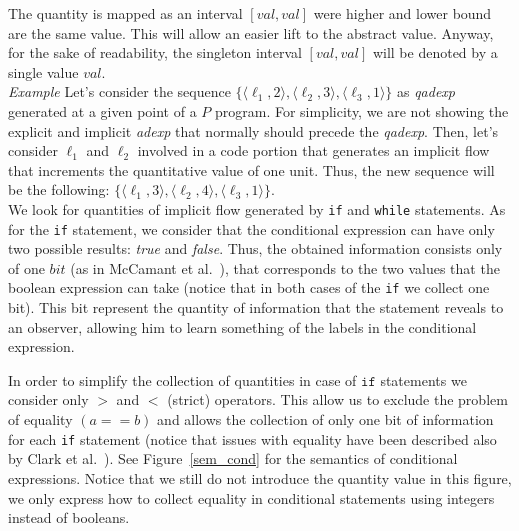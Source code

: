 \documentclass{llncs}
\newcommand{\notegian}[1]{\textbf{(NOTE: #1)}}
\begin{document}
\noindent The quantity is mapped as an interval $[val, val]$ were higher and lower bound are the same value. This will allow an easier lift to the abstract value. Anyway, for the sake of readability, the singleton interval $[val,val]$ will be denoted by a single value $val$.\\%

\noindent \textit{Example} Let's consider the sequence $\{\langle \ell_1, 2\rangle, \langle \ell_2, 3\rangle, \langle \ell_3, 1\rangle\}$ as \emph{qadexp} generated at a given point of a $P$ program. For simplicity, we are not showing the explicit and implicit \emph{adexp} that normally should precede the \emph{qadexp}. Then, let's consider $\ell_1$ and $\ell_2$ involved in a code portion that generates an implicit flow that increments the quantitative value of one unit. Thus, the new sequence will be the following: $\{\langle \ell_1, 3\rangle, \langle \ell_2, 4\rangle, \langle \ell_3, 1\rangle\}$. \\


\noindent We look for quantities of implicit flow generated by \texttt{if} and \texttt{while} statements. As for the \texttt{if} statement, we consider that the conditional expression can have only two possible results: \emph{true} and \emph{false}. Thus, the obtained information consists only of one $bit$ (as in McCamant et al.~\cite{McCamant07}), that corresponds to the two values that the boolean expression can take (notice that in both cases of the \texttt{if} we collect one bit). This bit represent the quantity of information that the statement reveals to an observer, allowing him to learn something of the labels in the conditional expression.


In order to simplify the collection of quantities in case of $\texttt{if}$ statements we consider only $>$ and $<$ (strict) operators. This allow us to exclude the problem of equality $(a==b)$ and allows the collection of only one bit of information for each \texttt{if} statement (notice that issues with equality have been described also by Clark et al.~\cite{city191,Clark04}).  See Figure~\ref{sem_cond} for the semantics of conditional expressions. Notice that we still do not introduce the quantity value in this figure, we only express how to collect equality in conditional statements using integers instead of booleans. 
\end{document}
